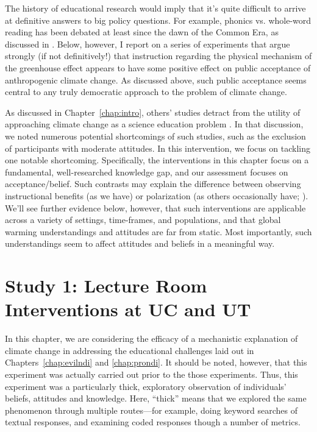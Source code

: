 The history of educational research would imply that it’s quite difficult to
arrive at definitive answers to big policy questions. For example, phonics vs.
whole-word reading has been debated at least since the dawn of the Common Era,
as discussed in \textcite{compayre_history_1889}. Below, however, I report
on a series of experiments that argue strongly (if not definitively!) that
instruction regarding the physical mechanism of the greenhouse effect appears to
have some positive effect on public acceptance of anthropogenic climate change.
As discussed above, such public acceptance seems central to any truly democratic
approach to the problem of climate change.

As discussed in Chapter~\ref{chap:intro}, others’ studies detract from the
utility of approaching climate change as a science education problem
\parencite[e.g.,]{lord_biased_1979,kahan_polarizing_2012}. In that discussion,
we noted numerous potential shortcomings of such studies, such as the exclusion
of participants with moderate attitudes. In this intervention, we focus on
tackling one notable shortcoming. Specifically, the interventions in this chapter 
focus on a fundamental, well-researched knowledge gap, and our assessment
focuses on acceptance/belief.  Such contrasts may explain the difference between
observing instructional benefits (as we have) or polarization (as others
occasionally have; \cite[cf.]{lundmark_new_2007}).  We'll see further evidence
below, however, that such interventions are applicable across a variety of
settings, time-frames, and populations, and that global warming understandings
and attitudes are far from static. Most importantly, such understandings seem to
affect attitudes and beliefs in a meaningful way.


\section{Study 1: Lecture Room Interventions at UC and UT}
\label{sec:mech-classroom}

In this chapter, we are considering the efficacy of a mechanistic explanation of
climate change in addressing the educational challenges laid out in
Chapters~\ref{chap:evilndi} and \ref{chap:prondi}. It should be noted, however,
that this experiment was actually carried out prior to the those experiments.
Thus, this experiment was a particularly thick, exploratory observation of
individuals' beliefs, attitudes and knowledge. Here, “thick” means that we
explored the same phenomenon through multiple routes---for example, doing keyword
searches of textual responses, and examining coded responses though a number of
metrics. 

